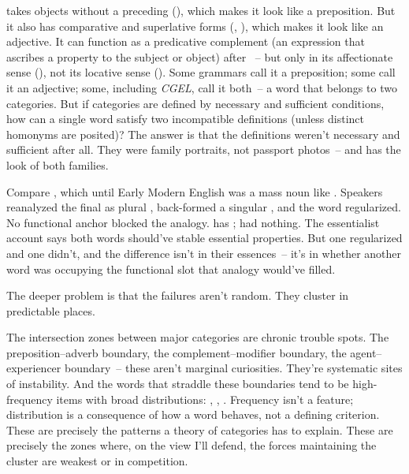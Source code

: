  takes objects without a preceding  (), which makes it look like a preposition. But it also has comparative and superlative forms (, ), which makes it look like an adjective. It can function as a predicative complement (an expression that ascribes a property to the subject or object) after ~-- but only in its affectionate sense (), not its locative sense (). Some grammars call it a preposition; some call it an adjective; some, including \textit{CGEL}, call it both~-- a word that belongs to two categories. But if categories are defined by necessary and sufficient conditions, how can a single word satisfy two incompatible definitions (unless distinct homonyms are posited)? The answer is that the definitions weren't necessary and sufficient after all. They were family portraits, not passport photos~-- and  has the look of both families.

Compare , which until Early Modern English was a mass noun like . Speakers reanalyzed the final  as plural , back-formed a singular , and the word regularized. No functional anchor blocked the analogy.  has ;  had nothing. The essentialist account says both words should've stable essential properties. But one regularized and one didn't, and the difference isn't in their essences~-- it's in whether another word was occupying the functional slot that analogy would've filled.

The deeper problem is that the failures aren't random. They cluster in predictable places.

The intersection zones between major categories are chronic trouble spots. The preposition--adverb boundary, the complement--modifier boundary, the agent--experiencer boundary~-- these aren't marginal curiosities. They're systematic sites of instability. And the words that straddle these boundaries tend to be high-frequency items with broad distributions: , , . Frequency isn't a feature; distribution is a consequence of how a word behaves, not a defining criterion. These are precisely the patterns a theory of categories has to explain. These are precisely the zones where, on the view I'll defend, the forces maintaining the cluster are weakest or in competition.

